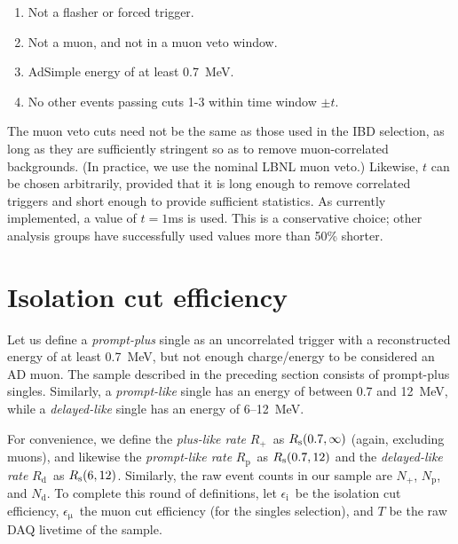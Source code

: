 \documentclass[../thesis.tex]{subfiles}
\begin{document}
\begin{enumerate}
\item Not a flasher or forced trigger.
\item Not a muon, and not in a muon veto window.
\item AdSimple energy of at least 0.7~MeV.
\item No other events passing cuts 1-3 within time window $\pm t$.
\end{enumerate}

The muon veto cuts need not be the same as those used in the IBD selection, as long as they are sufficiently stringent so as to remove muon-correlated backgrounds. (In practice, we use the nominal LBNL muon veto.) Likewise, $t$ can be chosen arbitrarily, provided that it is long enough to remove correlated triggers and short enough to provide sufficient statistics. As currently implemented, a value of $t = 1$ms is used. This is a conservative choice; other analysis groups have successfully used values more than 50\% shorter.

\def\Rplu{\ensuremath{R_\mathrm{+}}}
\def\Rpro{\ensuremath{R_\mathrm{p}}}
\def\Rdel{\ensuremath{R_\mathrm{d}}}
\def\Nplu{\ensuremath{N_\mathrm{+}}}
\def\Npro{\ensuremath{N_\mathrm{p}}}
\def\Ndel{\ensuremath{N_\mathrm{d}}}
\def\eisol{\ensuremath{\epsilon_\mathrm{i}}}
\def\emu{\ensuremath{\epsilon_\mathrm{\mu}}}

\section{Isolation cut efficiency}
\label{sec:isolcuteff}

Let us define a \emph{prompt-plus} single as an uncorrelated trigger with a reconstructed energy of at least 0.7~MeV, but not enough charge/energy to be considered an AD muon. The sample described in the preceding section consists of prompt-plus singles. Similarly, a \emph{prompt-like} single has an energy of between 0.7 and 12~MeV, while a \emph{delayed-like} single has an energy of 6--12~MeV.

For convenience, we define the \emph{plus-like rate} \Rplu\ as $R_\mathrm{s}(0.7,\infty)$ (again, excluding muons), and likewise the \emph{prompt-like rate} \Rpro\ as $R_\mathrm{s}(0.7, 12)$ and the \emph{delayed-like rate} \Rdel\ as $R_\mathrm{s}(6, 12)$. Similarly, the raw event counts in our sample are \Nplu, \Npro, and \Ndel. To complete this round of definitions, let \eisol\ be the isolation cut efficiency, \emu\ the muon cut efficiency (for the singles selection), and $T$ be the raw DAQ livetime of the sample.
\end{document}
